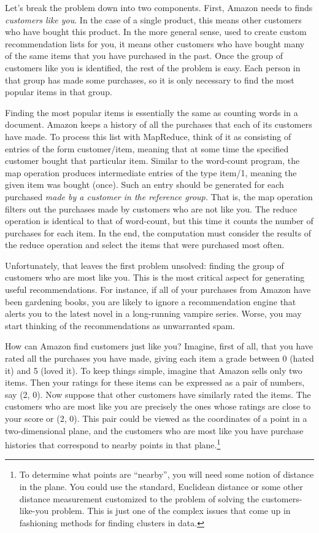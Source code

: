 Let's break the problem down into
two components.  First, Amazon needs to finds \textit{customers like
you}.  In the case of a single product, this means other customers who
have bought this product.  In the more general sense, used to create custom
recommendation lists for you, it means other customers who have bought many
of the same items that you have purchased in the past.  Once the group of
customers like you is identified, the rest of the problem is easy.  Each
person in that group has made some purchases, so it is only necessary to
find the most popular items in that group.

Finding the most popular items is essentially the same as counting words
in a document.
Amazon keeps a history of all the purchases that each of its
customers have made.  To process this list with MapReduce, think of it as
consisting of entries of the form customer/item, meaning that at some time the specified
customer bought that particular item.  Similar to the word-count program,
the map operation produces intermediate entries of the type item/1, meaning
the given item was bought (once).  Such an entry should be generated for
each purchased \textit{made by a customer in the reference group.}  That is,
the map operation filters out the purchases made by customers who are
not like you.  The reduce operation is identical to that of word-count,
but this time it counts the number of purchases for each item.
In the end, the computation must consider the results of the reduce operation
and select the items that were purchased most often.

Unfortunately, that leaves the first problem unsolved: finding the group of
customers who are most like you.  This is the most critical aspect for
generating useful recommendations.  For instance, if all of your purchases
from Amazon have been gardening books, you are likely to ignore a
recommendation engine that alerts you to the latest novel in a long-running
vampire series.  Worse, you may start thinking of the recommendations
as unwarranted spam.

How can Amazon find customers just like you?  Imagine, first of all, that
you have rated all the purchases you have made, giving each item a grade between
0 (hated it) and 5 (loved it).  To keep things simple, imagine that Amazon
sells only two items.  Then your ratings for these items can be expressed as
a pair of numbers, say (2, 0).  Now suppose that other customers have similarly
rated the items.  The customers who are most like you are precisely the ones
whose ratings are close to your score or (2, 0).  This pair could be viewed
as the coordinates of a point in a two-dimensional plane,
and the customers who
are most like you have purchase histories that correspond to nearby
points in that plane.\footnote{To
determine what points are ``nearby'', you will need
some notion of distance in the plane. You could use the standard,
Euclidean distance or some other distance measurement customized
to the problem of solving the customers-like-you problem.
This is just one of the complex issues that come up
in fashioning methods for finding clusters in data.}

